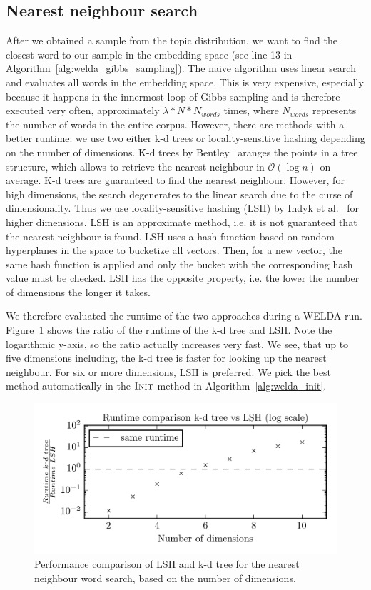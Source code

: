 \documentclass[
        a4paper,
        titlepage,
        twoside,
        parskip,
        numbers=noenddot
        ]{scrbook}
\theoremstyle{break}
\begin{document}
\subsection{Nearest neighbour search}
After we obtained a sample from the topic distribution, we want to find the closest word to our sample in the embedding space (see line 13 in Algorithm~\ref{alg:welda_gibbs_sampling}).
The naive algorithm uses linear search and evaluates all words in the embedding space.
This is very expensive, especially because it happens in the innermost loop of Gibbs sampling and is therefore executed very often, approximately $\lambda * N * N_{words}$ times, where $N_{words}$ represents the number of words in the entire corpus.
However, there are methods with a better runtime: we use two either k-d trees or locality-sensitive hashing depending on the number of dimensions.
K-d trees by Bentley~\cite{Bentley1975} aranges the points in a tree structure, which allows to retrieve the nearest neighbour in $\mathcal{O}(\log n)$ on average.
K-d trees are guaranteed to find the nearest neighbour.
However, for high dimensions, the search degenerates to the linear search due to the curse of dimensionality.
Thus we use locality-sensitive hashing (LSH) by Indyk et al.~\cite{Indyk1998} for higher dimensions.
LSH is an approximate method, i.e. it is not guaranteed that the nearest neighbour is found.
LSH uses a hash-function based on random hyperplanes in the space to bucketize all vectors.
Then, for a new vector, the same hash function is applied and only the bucket with the corresponding hash value must be checked.
LSH has the opposite property, i.e. the lower the number of dimensions the longer it takes.

We therefore evaluated the runtime of the two approaches during a WELDA run.
Figure~\ref{fig:lsh_vs_kdtree} shows the ratio of the runtime of the k-d tree and LSH.
Note the logarithmic y-axis, so the ratio actually increases very fast.
We see, that up to five dimensions including, the k-d tree is faster for looking up the nearest neighbour.
For six or more dimensions, LSH is preferred.
We pick the best method automatically in the $\textsc{Init}$ method in Algorithm~\ref{alg:welda_init}.
\begin{figure}
       \centering
       \includegraphics[width=12cm]{figures/lsh_vs_kdtree.png}
       \caption{Performance comparison of LSH and k-d tree for the nearest neighbour word search, based on the number of dimensions.}
       \label{fig:lsh_vs_kdtree}
\end{figure}
\end{document}
